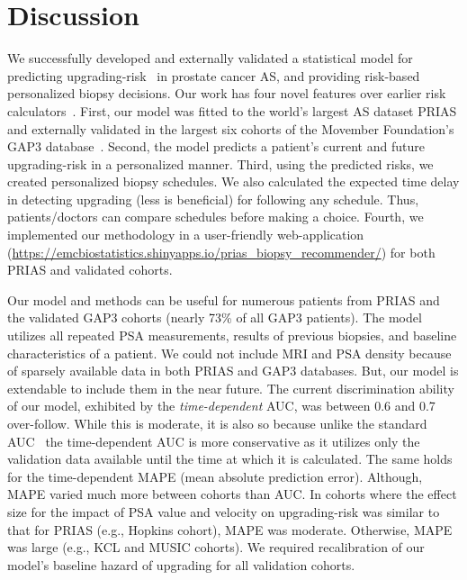 \section{Discussion}
We successfully developed and externally validated a statistical model for predicting upgrading-risk~\citep{bruinsma2017expert} in prostate cancer AS, and providing risk-based personalized biopsy decisions. Our work has four novel features over earlier risk calculators~\citep{coley2017prediction,ankerst2015precision}. First, our model was fitted to the world's largest AS dataset PRIAS and externally validated in the largest six cohorts of the Movember Foundation's GAP3 database~\citep{gap3_2018}. Second, the model predicts a patient's current and future upgrading-risk in a personalized manner. Third, using the predicted risks, we created personalized biopsy schedules. We also calculated the expected time delay in detecting upgrading (less is beneficial) for following any schedule. Thus, patients/doctors can compare schedules before making a choice. Fourth, we implemented our methodology in a user-friendly web-application (\url{https://emcbiostatistics.shinyapps.io/prias_biopsy_recommender/}) for both PRIAS and validated cohorts.

Our model and methods can be useful for numerous patients from PRIAS and the validated GAP3 cohorts (nearly 73\% of all GAP3 patients). The model utilizes all repeated PSA measurements, results of previous biopsies, and baseline characteristics of a patient. We could not include MRI and PSA density because of sparsely available data in both PRIAS and GAP3 databases. But, our model is extendable to include them in the near future. The current discrimination ability of our model, exhibited by the \textit{time-dependent} AUC, was between 0.6 and 0.7 over-follow. While this is moderate, it is also so because unlike the standard AUC~\citep{steyerberg2010assessing} the time-dependent AUC is more conservative as it utilizes only the validation data available until the time at which it is calculated. The same holds for the time-dependent MAPE (mean absolute prediction error). Although, MAPE varied much more between cohorts than AUC. In cohorts where the effect size for the impact of PSA value and velocity on upgrading-risk was similar to that for PRIAS (e.g., Hopkins cohort), MAPE was moderate. Otherwise, MAPE was large (e.g., KCL and MUSIC cohorts). We required recalibration of our model's baseline hazard of upgrading for all validation cohorts.


